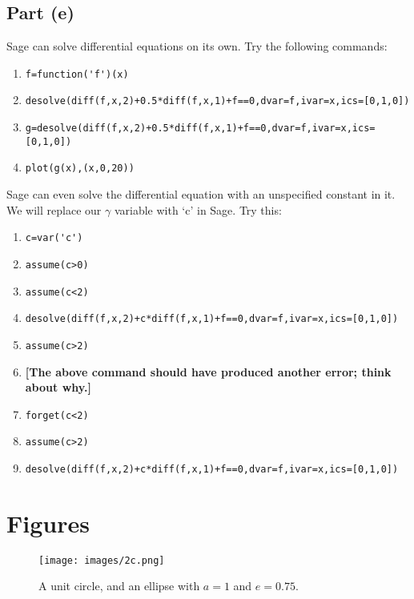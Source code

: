 \documentclass[letterpaper, 12pt]{amsart}
\theoremstyle{definition}  %
\begin{document}
		\subsection*{Part (e)}
		Sage can solve differential equations on its own. 
		Try the following commands:
			\begin{enumerate}[]
				\item \verb|f=function('f')(x)|

				\item \verb|desolve(diff(f,x,2)+0.5*diff(f,x,1)+f==0,dvar=f,ivar=x,ics=[0,1,0])|

				\item \verb|g=desolve(diff(f,x,2)+0.5*diff(f,x,1)+f==0,dvar=f,ivar=x,ics=[0,1,0])|

				\item \verb|plot(g(x),(x,0,20))|
			\end{enumerate}
		Sage can even solve the differential equation with an unspecified constant in it. 
		We will replace our $\gamma$ variable with `c' in Sage. 
		Try this:
			\begin{enumerate}[]
				\item \verb|c=var('c')|

				\item \verb|assume(c>0)|

				\item \verb|assume(c<2)|

				\item \verb|desolve(diff(f,x,2)+c*diff(f,x,1)+f==0,dvar=f,ivar=x,ics=[0,1,0])|

				\item \verb|assume(c>2)|

				\item \textbf{[The above command should have produced another error; think about why.]}

				\item \verb|forget(c<2)|

				\item \verb|assume(c>2)|

				\item \verb|desolve(diff(f,x,2)+c*diff(f,x,1)+f==0,dvar=f,ivar=x,ics=[0,1,0])|
			\end{enumerate}
	\newpage

	\section{Figures}
	\label{sec:figures}
		\begin{figure}[h]
			\texttt{[image: images/2c.png]}
			\caption{A unit circle, and an ellipse with $a=1$ and $e=0.75$.}
			\label{circle1}
		\end{figure}
\end{document}
